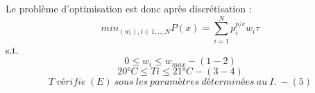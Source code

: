 \documentclass[11pt]{article}
\begin{document}
Le problème d'optimisation est donc après discrétisation :
\[ {min}_{(w_i), i\in {1,..,N}} P(x)= \sum_{i=1}^N{p}_i^{p/c}w_i\tau \]
s.t. \[ 0 \leq w_i \leq w_{max} -(1-2) \]
\[  20 ° C \leq Ti \leq 21°C - (3-4)\]
\[ T  \ vérifie \ (E) \ sous \ les \ paramètres \ déterminées\ au \  I.\ -(5)\]


    
    
    
\end{document}
